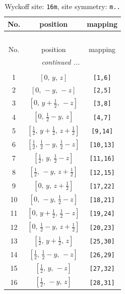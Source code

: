 \documentclass[fleqn,8pt]{jsarticle}
\begin{document}
\renewcommand{\arraystretch}{1.2}
\begin{longtable}{ccc}
\caption{Wyckoff site: {\tt 16m}, site symmetry: {\tt m..}}
 \\
 \hline \hline
No. & position & mapping \\ \hline \endfirsthead

\multicolumn{2}{l}{\tablename\ \thetable{}} \\
 \hline \hline
No. & position & mapping \\ \hline \endhead

 \hline \hline
\multicolumn{2}{r}{\footnotesize\it continued ...} \\ \endfoot

 \hline \hline
\multicolumn{2}{r}{} \\ \endlastfoot

1 & $\left[ 0,\, y,\, z \right]$ & {\tt [1,6]} \\ \hline
2 & $\left[ 0,\, - y,\, - z \right]$ & {\tt [2,5]} \\ \hline
3 & $\left[ 0,\, y + \frac{1}{2},\, - z \right]$ & {\tt [3,8]} \\ \hline
4 & $\left[ 0,\, \frac{1}{2} - y,\, z \right]$ & {\tt [4,7]} \\ \hline
5 & $\left[ \frac{1}{2},\, y + \frac{1}{2},\, z + \frac{1}{2} \right]$ & {\tt [9,14]} \\ \hline
6 & $\left[ \frac{1}{2},\, \frac{1}{2} - y,\, \frac{1}{2} - z \right]$ & {\tt [10,13]} \\ \hline
7 & $\left[ \frac{1}{2},\, y,\, \frac{1}{2} - z \right]$ & {\tt [11,16]} \\ \hline
8 & $\left[ \frac{1}{2},\, - y,\, z + \frac{1}{2} \right]$ & {\tt [12,15]} \\ \hline
9 & $\left[ 0,\, y,\, z + \frac{1}{2} \right]$ & {\tt [17,22]} \\ \hline
10 & $\left[ 0,\, - y,\, \frac{1}{2} - z \right]$ & {\tt [18,21]} \\ \hline
11 & $\left[ 0,\, y + \frac{1}{2},\, \frac{1}{2} - z \right]$ & {\tt [19,24]} \\ \hline
12 & $\left[ 0,\, \frac{1}{2} - y,\, z + \frac{1}{2} \right]$ & {\tt [20,23]} \\ \hline
13 & $\left[ \frac{1}{2},\, y + \frac{1}{2},\, z \right]$ & {\tt [25,30]} \\ \hline
14 & $\left[ \frac{1}{2},\, \frac{1}{2} - y,\, - z \right]$ & {\tt [26,29]} \\ \hline
15 & $\left[ \frac{1}{2},\, y,\, - z \right]$ & {\tt [27,32]} \\ \hline
16 & $\left[ \frac{1}{2},\, - y,\, z \right]$ & {\tt [28,31]} \\
\end{longtable}
\end{document}
